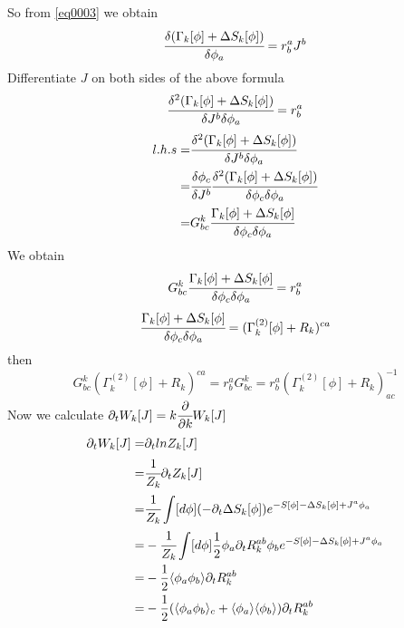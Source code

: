 \documentclass[UTF8]{article}
\begin{document}
So from \eqref{eq0003} we obtain
\begin{equation}
\cfrac{\delta(\Gamma_k[\phi]+\Delta S_k[\phi])}{\delta\phi_a}
=r_b^aJ^b
\end{equation}
Differentiate $J$ on both sides of the above formula
\begin{equation}
\cfrac{\delta^2(\Gamma_k[\phi]+\Delta S_k[\phi])}
{\delta J^b\delta\phi_a}
=r_b^a
\end{equation}
\begin{equation}
\begin{split}
l.h.s=& \cfrac{\delta^2(\Gamma_k[\phi]+\Delta S_k[\phi])}
{\delta J^b\delta\phi_a}
\\=& \cfrac{\delta\phi_c}{\delta J^b}\cfrac{\delta^2(\Gamma_k[\phi]+\Delta S_k[\phi])}
{\delta\phi_c\delta\phi_a}\\
=& G^{k}_{bc}\cfrac{\Gamma_k[\phi]+\Delta S_k[\phi]}{\delta\phi_c\delta\phi_a}\\
\end{split}
\end{equation}
We obtain
\begin{equation}
G^{k}_{bc}\cfrac{\Gamma_k[\phi]+\Delta S_k[\phi]}{\delta\phi_c\delta\phi_a}=r^{a}_{b}
\end{equation}
\begin{equation}
\cfrac{\Gamma_k[\phi]+\Delta S_k[\phi]}{\delta\phi_c\delta\phi_a}
=(\Gamma^{(2)}_{k}[\phi]+R_k)^{ca}
\end{equation}
then
\begin{equation}
G^{k}_{bc}(\Gamma^{(2)}_{k}[\phi]+R_k)^{ca}=r^{a}_{b}
G^{k}_{bc}=r^{a}_{b}(\Gamma^{(2)}_{k}[\phi]+R_k)^{-1}_{ac}
\end{equation}
Now we calculate $\partial_tW_k[J]=k\cfrac{\partial}{\partial k}W_k[J]$
\begin{equation}
\begin{split}
\partial_tW_k[J]=& \partial_tlnZ_k[J]\\
=& \cfrac{1}{Z_k}\partial_tZ_k[J]\\
=& \cfrac{1}{Z_k}\int[d\phi](-\partial_t\Delta S_k[\phi])e^{-S[\phi]-\Delta S_k[\phi]+J^a\phi_a}\\
=& -\cfrac{1}{Z_k}\int[d\phi]\frac{1}{2}\phi_a\partial_tR^{ab}_{k}\phi_be^{-S[\phi]-\Delta S_k[\phi]+J^a\phi_a}\\
=& -\frac{1}{2}\langle\phi_a\phi_b\rangle\partial_tR^{ab}_{k}\\
=& -\frac{1}{2}(\langle\phi_a\phi_b\rangle_c+\langle\phi_a\rangle\langle\phi_b\rangle)\partial_tR^{ab}_{k}
\end{split}
\end{equation}
\end{document}
